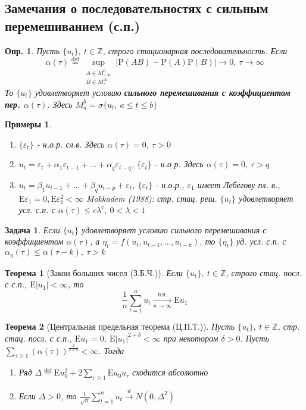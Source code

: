 \documentclass[12pt]{article}
\newtheorem{definition}{Опр.}
\newtheorem*{theorem*}{Теорема}
\newtheorem*{examples}{Примеры}
\newtheorem*{task}{Задача}
\newcommand\defin[1]{\textbf{#1}}
\newcommand*{\defeq}{\stackrel{\text{def}}{=}}
\def\eps{ \varepsilon }
\def\Z{ \mathbb{Z} }
\def\E{ \mathrm{E} }
\def\P{ \mathrm{P} }
\begin{document}
\subsection{Замечания о последовательностях с сильным перемешиванием (с.п.)}
\begin{definition}
    Пусть $\{u_t\},\ t\in\Z$, строго стационарная последовательность. Если
    \[\alpha(\tau)\defeq\sup_{\substack{A\in M_{-\infty}^0\\ B\in M_{\tau}^{\infty}}}\left\lvert \P(AB)-\P(A)\P(B)\right\rvert \rightarrow0,\ \tau\rightarrow\infty\]
    То $\{u_t\}$ удовлетворяет условию \defin{сильного перемешивания с коэффициентом пер. $\alpha(\tau)$}.
    Здесь $M_a^b=\sigma\{u_t,\ a\leq t\leq b\}$
\end{definition}
\begin{examples}
    \begin{enumerate}
        \item $\{\eps_t\}$ - н.о.р. сл.в. Здесь $\alpha(\tau)=0,\ \tau>0$
        \item $u_t=\eps_t+\alpha_1\eps_{t-1}+\ldots +\alpha_q\eps_{t-q}$, $\{\eps_t\}$ - н.о.р. Здесь $\alpha(\tau)=0,\ \tau>q$
        \item $u_t=\beta_1u_{t-1}+\ldots+\beta_qu_{t-p}+\eps_t$, $\{\eps_t\}$ - н.о.р., $\eps_1$ имеет Лебегову пл. в.,
        $\E\eps_1=0, \E\eps_1^2<\infty$
        Mokkadem (1988): стр. стац. реш. $\{u_t\}$ удовлетворяет усл. с.п. с $\alpha(\tau)\leq c\lambda^\tau,\ 0<\lambda<1$
    \end{enumerate}
\end{examples}
\begin{task}
    Если $\{u_t\}$ удовлетворяет условию сильного перемешивания с коэффициентом $\alpha(\tau)$,
    а $\eta_t=f(u_t,u_{t-1},\ldots,u_{t-k})$, то $\{\eta_t\}$ уд. усл. с.п. с $\alpha_\eta(\tau)\leq\alpha(\tau-k),\ \tau>k$
\end{task}
\begin{theorem*}[Закон больших чисел (З.Б.Ч.)]
    Если $\{u_t\},\ t\in\Z$, строго стац. посл. с с.п., $\E\left\lvert u_1\right\rvert <\infty$, то
    \[\frac{1}{n}\sum_{t=1}^nu_t\underset{n\rightarrow\infty}{\xrightarrow{\text{п.н.}}}\E u_1\]
\end{theorem*}
\begin{theorem*}[Центральная предельная теорема (Ц.П.Т.)]
    Пусть $\{u_t\},\ t\in\Z$, стр. стац. посл. с с.п., $\E u_1=0,\ \E\left\lvert u_1\right\rvert ^{2+\delta}<\infty$ при некотором $\delta>0$.
    Пусть $\sum_{\tau\geq1}(\alpha(\tau))^{\frac{2}{2+\delta}}<\infty$. Тогда
    \begin{enumerate}
        \item Ряд $\Delta\defeq\E u_0^2+2\sum_{\tau\geq1}\E u_0u_\tau$ сходится абсолютно
        \item Если $\Delta>0$, то $\frac{1}{\sqrt{n}}\sum_{t=1}^nu_t\xrightarrow{d}N(0,\Delta^2)$
    \end{enumerate}
\end{theorem*}
\end{document}
